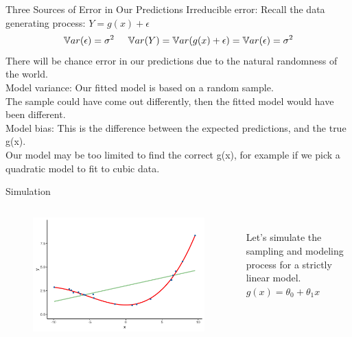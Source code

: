 \documentclass[aspectratio=169]{../latex_main/tntbeamer}  %
\begin{document}
	
	\begin{frame}[c]{Three Sources of Error in Our Predictions}
	   Irreducible error: Recall the data generating process: $Y = g(x) + \epsilon$
	   \begin{equation*}
	       \mathbb{V}ar(\epsilon) = \sigma^2 \hspace{5mm} \mathbb{V}ar(Y) = \mathbb{V}ar(g(x) + \epsilon) = \mathbb{V}ar(\epsilon) = \sigma^2
	   \end{equation*}
	   There will be chance error in our predictions due to the natural randomness of the world.\\
	   \bigskip
	   Model variance: Our fitted model is based on a random sample.\\
        The sample could have come out differently, then the fitted model would have been different.\\
        \bigskip
        Model bias: This is the difference between the expected predictions, and the true g(x).\\
        Our model may be too limited to find the correct g(x), for example if we pick a quadratic model to fit to cubic data.

	\end{frame}
	
	
	\begin{frame}[c]{Simulation}
	  \begin{columns}
	      \begin{column}{.6\textwidth}
	           \begin{figure}
	               \includegraphics[scale=.5]{Bild9}
	           \end{figure} 
	      \end{column}
	      
	      \begin{column}{.4\textwidth}
	      \\
	      \bigskip
	      \bigskip
	      \bigskip
	            Let’s simulate the sampling and modeling process for a strictly linear model.\\
	            $g(x) = \theta_0 + \theta_1x$
	      \end{column}
	  \end{columns}
	\end{frame}
	
\end{document}
